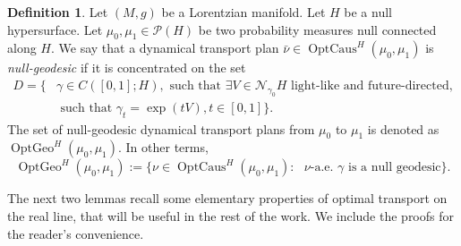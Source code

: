 \documentclass[12pt,a4paper]{amsart}
\theoremstyle{plain}
\theoremstyle{definition}
\newtheorem{definition}[lemma]{Definition}
\numberwithin{equation}{section}
\DeclareMathOperator{\OptCaus}{OptCaus}
\DeclareMathOperator{\OptGeo}{OptGeo}
\newcommand{\Prob}{\mathcal P}
\newcommand{\normal}{\mathscr{N}}
\begin{document}
\begin{definition}\label{def:nullgeodDynTP}
Let $(M,g)$ be a Lorentzian manifold.
  Let $H$ be a null hypersurface.
  Let $\mu_0,\mu_1\in \Prob(H)$ be two probability measures null connected
  along $H$.
  We say that a dynamical transport plan
  $\bar\nu\in\OptCaus^H(\mu_0,\mu_1)$ is \emph{null-geodesic} if it
  is concentrated on the set
  \begin{equation*}
    \begin{aligned}
      D=\{
      &
        \gamma\in C([0,1]; H),\text{ such that }
    \exists V\in \normal_{\gamma_0} H
        \text{ light-like and future-directed,}
      \\
      &
        \text{ such that }
    \gamma_t=\exp(tV)
    ,
    t\in[0,1]
    \}
    .
    \end{aligned}
  \end{equation*}
  The set of null-geodesic dynamical transport plans from $\mu_0$ to $\mu_1$ is denoted as $\OptGeo^H(\mu_0,\mu_1)$. In other terms, 
   \begin{equation}
\OptGeo^H(\mu_0,\mu_1) := \{ \nu \in \OptCaus^H(\mu_0,\mu_1) \colon \text{ $\nu$-a.e.\ $\gamma$ is a null geodesic}\}.
\end{equation}
\end{definition}



The next two lemmas recall some elementary properties of optimal transport on the real line, that will be useful in the rest of the work. We include the proofs for the reader's convenience.
\end{document}
